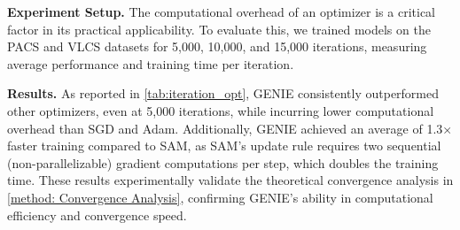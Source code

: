 \documentclass{article}
\theoremstyle{plain}
\theoremstyle{definition}
\theoremstyle{remark}
\begin{document}
\begin{table}[ht]
\caption{Comparison of optimizers on DG datasets. Results denoted by * are reproduced from \cite{dg_opt} using the same protocol as our paper. The best results for each dataset are highlighted in bold.}
\label{tab:comparison_of_opt}
\vskip 0.1in
\begin{center}
\begin{small}
\begin{sc}
\end{sc}
\end{small}
\end{center}
\vskip -0.1in
\end{table}
\textbf{Experiment Setup.} The computational overhead of an optimizer is a critical factor in its practical applicability. To evaluate this, we trained models on the PACS and VLCS datasets for 5,000, 10,000, and 15,000 iterations, measuring average performance and training time per iteration.

\textbf{Results.} As reported in \cref{tab:iteration_opt}, GENIE consistently outperformed other optimizers, even at 5,000 iterations, while incurring lower computational overhead than SGD and Adam. Additionally, GENIE achieved an average of 1.3× faster training compared to SAM, as SAM’s update rule requires two sequential (non-parallelizable) gradient computations per step, which doubles the training time. These results experimentally validate the theoretical convergence analysis in \cref{method: Convergence Analysis}, confirming GENIE’s ability in computational efficiency and convergence speed.
\end{document}
